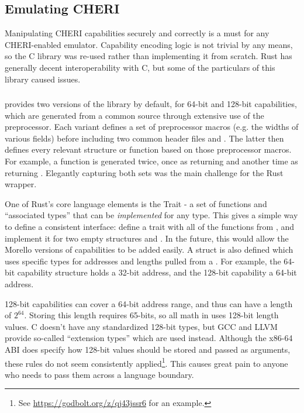 \subsection{Emulating CHERI}

Manipulating CHERI capabilities securely and correctly is a must for any CHERI-enabled emulator.
Capability encoding logic is not trivial by any means, so the  C library was re-used rather than implementing it from scratch.
Rust has generally decent interoperability with C, but some of the particulars of this library caused issues.

\subsubsection{}
 provides two versions of the library by default, for 64-bit and 128-bit capabilities, which are generated from a common source through extensive use of the preprocessor.
Each variant defines a set of preprocessor macros (e.g. the widths of various fields) before including two common header files  and .
The latter then defines every relevant structure or function based on those preprocessor macros.
For example, a function  is generated twice, once as   returning  and another time as  returning .
Elegantly capturing both sets was the main challenge for the Rust wrapper.

One of Rust's core language elements is the Trait - a set of functions and \enquote{associated types} that can be \emph{implemented} for any type.
This gives a simple way to define a consistent interface: define a trait  with all of the functions from , and implement it for two empty structures  and .
In the future, this would allow the Morello versions of capabilities to be added easily.
A struct  is also defined which uses specific types for addresses and lengths pulled from a .
For example, the 64-bit capability structure holds a 32-bit address, and the 128-bit capability a 64-bit address.

128-bit capabilities can cover a 64-bit address range, and thus can have a length of $2^{64}$.
Storing this length requires 65-bits, so all math in  uses 128-bit length values.
C doesn't have any standardized 128-bit types, but GCC and LLVM provide so-called ``extension types'' which are used instead.
Although the x86-64 ABI does specify how 128-bit values should be stored and passed as arguments\cite{specification-x86-psABI-v1.0}, these rules do not seem consistently applied\footnote{See \url{https://godbolt.org/z/qj43jssr6} for an example.}.
This causes great pain to anyone who needs to pass them across a language boundary.


